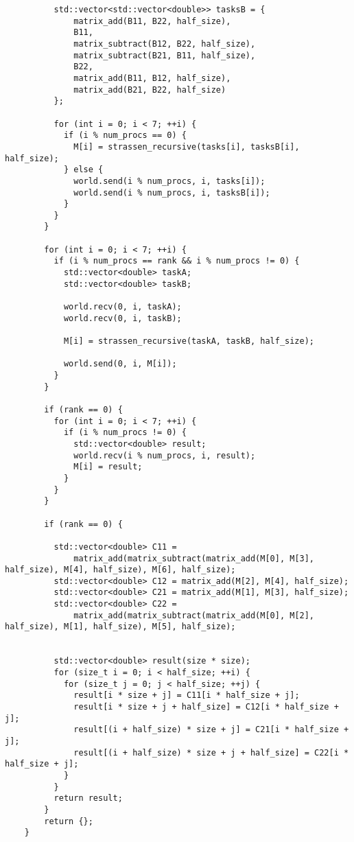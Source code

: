 \documentclass{report}
\begin{document}
\begin{lstlisting}
          std::vector<std::vector<double>> tasksB = {
              matrix_add(B11, B22, half_size),
              B11,
              matrix_subtract(B12, B22, half_size),
              matrix_subtract(B21, B11, half_size),
              B22,
              matrix_add(B11, B12, half_size),
              matrix_add(B21, B22, half_size)
          };

          for (int i = 0; i < 7; ++i) {
            if (i % num_procs == 0) {
              M[i] = strassen_recursive(tasks[i], tasksB[i], half_size);
            } else {
              world.send(i % num_procs, i, tasks[i]);
              world.send(i % num_procs, i, tasksB[i]);
            }
          }
        }

        for (int i = 0; i < 7; ++i) {
          if (i % num_procs == rank && i % num_procs != 0) {
            std::vector<double> taskA;
            std::vector<double> taskB;

            world.recv(0, i, taskA);
            world.recv(0, i, taskB);

            M[i] = strassen_recursive(taskA, taskB, half_size);

            world.send(0, i, M[i]);
          }
        }

        if (rank == 0) {
          for (int i = 0; i < 7; ++i) {
            if (i % num_procs != 0) {
              std::vector<double> result;
              world.recv(i % num_procs, i, result);
              M[i] = result;
            }
          }
        }

        if (rank == 0) {

          std::vector<double> C11 =
              matrix_add(matrix_subtract(matrix_add(M[0], M[3], half_size), M[4], half_size), M[6], half_size);
          std::vector<double> C12 = matrix_add(M[2], M[4], half_size);
          std::vector<double> C21 = matrix_add(M[1], M[3], half_size);
          std::vector<double> C22 =
              matrix_add(matrix_subtract(matrix_add(M[0], M[2], half_size), M[1], half_size), M[5], half_size);


          std::vector<double> result(size * size);
          for (size_t i = 0; i < half_size; ++i) {
            for (size_t j = 0; j < half_size; ++j) {
              result[i * size + j] = C11[i * half_size + j];
              result[i * size + j + half_size] = C12[i * half_size + j];
              result[(i + half_size) * size + j] = C21[i * half_size + j];
              result[(i + half_size) * size + j + half_size] = C22[i * half_size + j];
            }
          }
          return result;
        }
        return {};
    }
\end{lstlisting}
\end{document}
